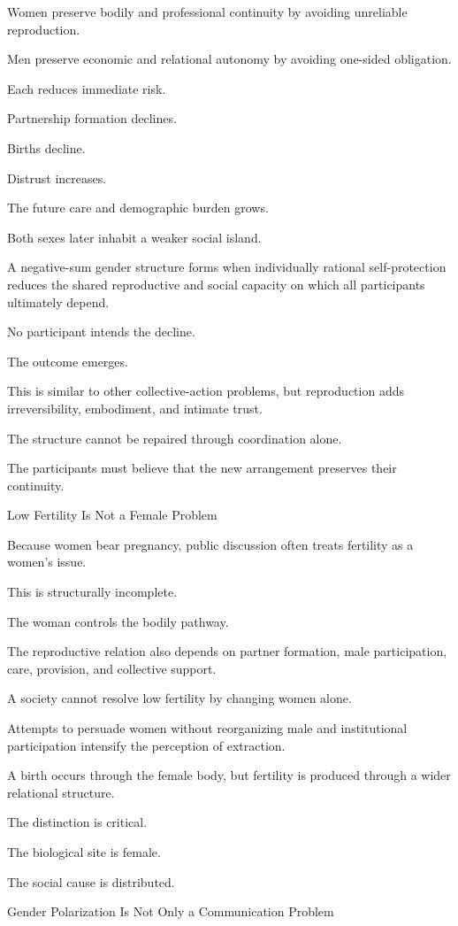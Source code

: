 Women preserve bodily and professional continuity by avoiding unreliable reproduction.

Men preserve economic and relational autonomy by avoiding one-sided obligation.

Each reduces immediate risk.

Partnership formation declines.

Births decline.

Distrust increases.

The future care and demographic burden grows.

Both sexes later inhabit a weaker social island.

A negative-sum gender structure forms when individually rational self-protection reduces the shared reproductive and social capacity on which all participants ultimately depend.

No participant intends the decline.

The outcome emerges.

This is similar to other collective-action problems, but reproduction adds irreversibility, embodiment, and intimate trust.

The structure cannot be repaired through coordination alone.

The participants must believe that the new arrangement preserves their continuity.

Low Fertility Is Not a Female Problem

Because women bear pregnancy, public discussion often treats fertility as a women’s issue.

This is structurally incomplete.

The woman controls the bodily pathway.

The reproductive relation also depends on partner formation, male participation, care, provision, and collective support.

A society cannot resolve low fertility by changing women alone.

Attempts to persuade women without reorganizing male and institutional participation intensify the perception of extraction.

A birth occurs through the female body, but fertility is produced through a wider relational structure.

The distinction is critical.

The biological site is female.

The social cause is distributed.

Gender Polarization Is Not Only a Communication Problem

